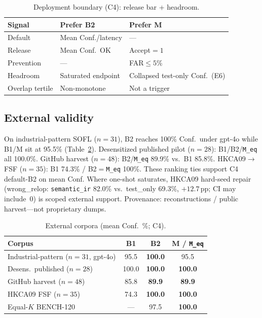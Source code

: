 \documentclass[10pt,conference]{IEEEtran}
\begin{document}
\begin{table}[t]
\centering
\caption{Deployment boundary (C4): release bar + headroom.}
\label{tab:deploy}
\footnotesize
\begin{tabular}{@{}lll@{}}
\toprule
Signal & Prefer B2 & Prefer M \\
\midrule
Default & Mean Conf./latency & --- \\
Release & Mean Conf.\ OK & Accept${=}1$ \\
Prevention & --- & FAR${\le}5\%$ \\
Headroom & Saturated endpoint & Collapsed test-only Conf.\ (E6) \\
Overlap tertile & Non-monotone & Not a trigger \\
\bottomrule
\end{tabular}
\end{table}

\subsection{External validity}
\label{sec:ext}
On industrial-pattern SOFL ($n{=}31$), B2 reaches 100\% Conf.\ under gpt-4o
while B1/M sit at 95.5\% (Table~\ref{tab:ext}).
Desensitized published pilot ($n{=}28$): B1/B2/\texttt{M\_eq} all 100.0\%.
GitHub harvest ($n{=}48$): B2/\texttt{M\_eq} 89.9\% vs.\ B1 85.8\%.
HKCA09$\rightarrow$FSF ($n{=}35$): B1 74.3\% / B2${=}$\texttt{M\_eq} 100\%.
These ranking ties support C4 default-B2 on mean Conf.
Where one-shot saturates, HKCA09 hard-seed repair (wrong\_relop:
\texttt{semantic\_ir} 82.0\% vs.\ test\_only 69.3\%, ${+}12.7$\,pp; CI may
include~0) is scoped external support.
Provenance: reconstructions / public harvest---not proprietary dumps.

\begin{table}[t]
\centering
\caption{External corpora (mean Conf.\ \%; C4).}
\label{tab:ext}
\footnotesize
\begin{tabular}{lccc}
\toprule
Corpus & B1 & B2 & M / \texttt{M\_eq} \\
\midrule
Industrial-pattern ($n{=}31$, gpt-4o) & 95.5 & \textbf{100.0} & 95.5 \\
Desens.\ published ($n{=}28$) & 100.0 & \textbf{100.0} & \textbf{100.0} \\
GitHub harvest ($n{=}48$) & 85.8 & \textbf{89.9} & \textbf{89.9} \\
HKCA09 FSF ($n{=}35$) & 74.3 & \textbf{100.0} & \textbf{100.0} \\
Equal-$K$ BENCH-120 & --- & 97.5 & \textbf{100.0} \\
\bottomrule
\end{tabular}
\end{table}
\end{document}
